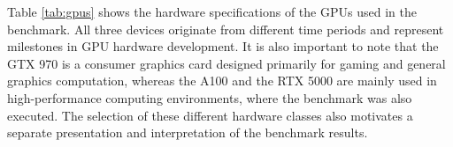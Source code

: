 Table \ref{tab:gpus} shows the hardware specifications of the GPUs used in the benchmark. 
All three devices originate from different time periods and represent milestones in GPU 
hardware development. It is also important to note that the GTX 970 is a consumer graphics 
card designed primarily for gaming and general graphics computation, whereas the A100 and 
the RTX 5000 are mainly used in high-performance computing environments, where the benchmark 
was also executed. The selection of these different hardware classes also motivates a 
separate presentation and interpretation of the benchmark results.
